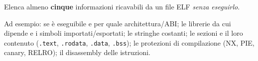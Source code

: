 \question[4]
Elenca almeno \textbf{cinque} informazioni ricavabili da un file ELF \emph{senza eseguirlo}.
\begin{solution}
Ad esempio: se è eseguibile e per quale architettura/ABI; le librerie da cui dipende e i simboli importati/esportati; le stringhe costanti; le sezioni e il loro contenuto (\lstinline|.text|, \lstinline|.rodata|, \lstinline|.data|, \lstinline|.bss|); le protezioni di compilazione (NX, PIE, canary, RELRO); il disassembly delle istruzioni.
\end{solution}
